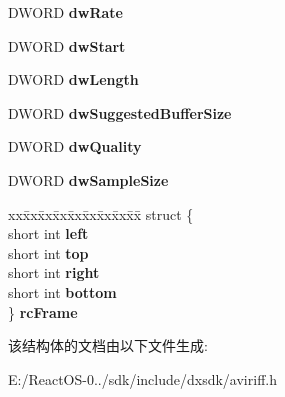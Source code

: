 \begin{DoxyCompactItemize}
\item 
\mbox{\label{struct__avistreamheader_a27cf23e0001b6013108a217eaacdfba0}} 
D\+W\+O\+RD {\bfseries dw\+Rate}
\item 
\mbox{\label{struct__avistreamheader_a5ec80a3ec275157eae5fba53851f4b07}} 
D\+W\+O\+RD {\bfseries dw\+Start}
\item 
\mbox{\label{struct__avistreamheader_af1a3fc76f7921483ede8f65e6e86229c}} 
D\+W\+O\+RD {\bfseries dw\+Length}
\item 
\mbox{\label{struct__avistreamheader_a3f1e927970c11a14a4e8ac9bf40b36bb}} 
D\+W\+O\+RD {\bfseries dw\+Suggested\+Buffer\+Size}
\item 
\mbox{\label{struct__avistreamheader_a41e7d169c9e648702c4765f8c8db6d54}} 
D\+W\+O\+RD {\bfseries dw\+Quality}
\item 
\mbox{\label{struct__avistreamheader_a187e36798f8a5ec86e7ab6373b8f4222}} 
D\+W\+O\+RD {\bfseries dw\+Sample\+Size}
\item 
\mbox{\label{struct__avistreamheader_ae885fc9ee53b3664cddec4c315d1d283}} 
\begin{tabbing}
xx\=xx\=xx\=xx\=xx\=xx\=xx\=xx\=xx\=\kill
struct \{\\
\>short int {\bfseries left}\\
\>short int {\bfseries top}\\
\>short int {\bfseries right}\\
\>short int {\bfseries bottom}\\
\} {\bfseries rcFrame}\\

\end{tabbing}\end{DoxyCompactItemize}


该结构体的文档由以下文件生成\+:\begin{DoxyCompactItemize}
\item 
E\+:/\+React\+O\+S-\/0../sdk/include/dxsdk/aviriff.\+h\end{DoxyCompactItemize}
